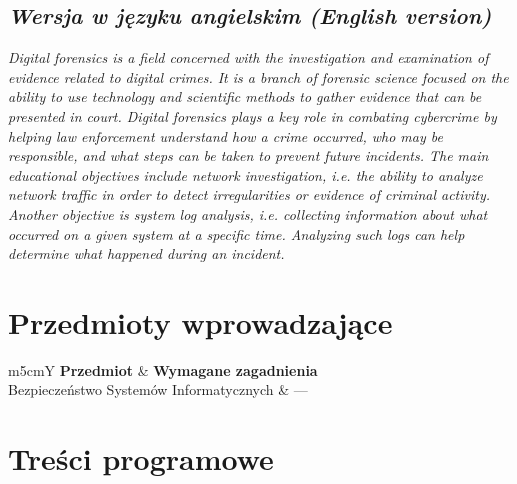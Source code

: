 \documentclass[12pt, a4paper]{article}
\newcommand{\thdrule}{\noalign{\global\setlength{\extrarowheight}{0pt}}}
\newcommand{\thdend}{\noalign{\global\setlength{\extrarowheight}{3pt}}}
\begin{document}
\subsection*{\textit{Wersja w języku angielskim (English version)}}

\textit{Digital forensics is a field concerned with the investigation and examination of evidence related to digital crimes. It is a branch of forensic science focused on the ability to use technology and scientific methods to gather evidence that can be presented in court. Digital forensics plays a key role in combating cybercrime by helping law enforcement understand how a crime occurred, who may be responsible, and what steps can be taken to prevent future incidents. The main educational objectives include network investigation, i.e. the ability to analyze network traffic in order to detect irregularities or evidence of criminal activity. Another objective is system log analysis, i.e. collecting information about what occurred on a given system at a specific time. Analyzing such logs can help determine what happened during an incident.}


\section{Przedmioty wprowadzające}

{\scriptsize
\begin{tabularx}{\textwidth}{m{5cm}Y}
\thdrule\toprule
{} {\color{white}\textbf{Przedmiot}} & {\color{white}\textbf{Wymagane zagadnienia}} \\
\midrule\thdend
   Bezpieczeństwo Systemów Informatycznych & --- \\
\bottomrule
\end{tabularx}}

\section{Treści programowe}
\end{document}
